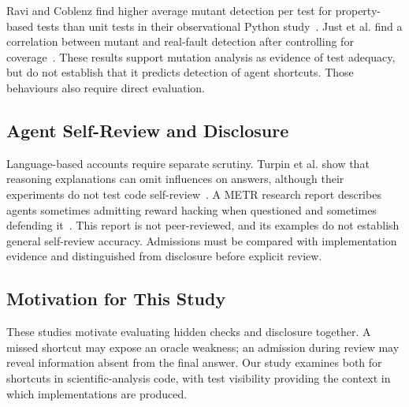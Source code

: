 Ravi and Coblenz find higher average mutant detection per test for
property-based tests than unit tests in their observational Python
study~\cite{ravi2025pbt}. Just et al. find a correlation between mutant and
real-fault detection after controlling for coverage~\cite{just2014mutants}.
These results support mutation analysis as evidence of test adequacy, but
do not establish that it predicts detection of agent shortcuts. Those
behaviours also require direct evaluation.

\subsection{Agent Self-Review and Disclosure}

Language-based accounts require separate scrutiny. Turpin et al. show that
reasoning explanations can omit influences on answers, although their
experiments do not test code self-review~\cite{turpin2023unfaithful}.
A METR research report describes agents sometimes admitting reward hacking
when questioned and sometimes defending it~\cite{vonarx2025rewardhacking}.
This report is not peer-reviewed, and its examples do not establish general
self-review accuracy. Admissions must be compared with implementation
evidence and distinguished from disclosure before explicit review.

\subsection{Motivation for This Study}

These studies motivate evaluating hidden checks and disclosure together.
A missed shortcut may expose an oracle weakness; an admission during review
may reveal information absent from the final answer. Our study examines
both for shortcuts in scientific-analysis code, with test visibility
providing the context in which implementations are produced.
